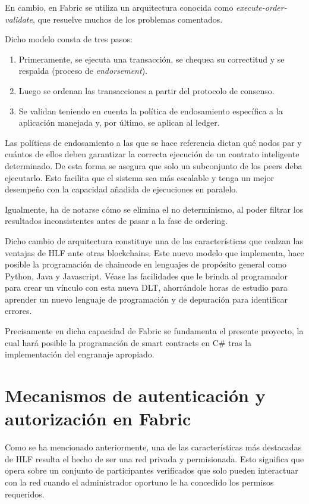 En cambio, en Fabric se utiliza un arquitectura conocida como \emph{execute-order-validate}, que resuelve muchos de los problemas comentados.

Dicho modelo consta de tres pasos:
\begin{enumerate}
	\item Primeramente, se ejecuta una transacci\'on, se chequea su correctitud y se respalda (proceso de \emph{endorsement}).
	
	\item Luego se ordenan las transacciones a partir del protocolo de consenso.
	
	\item Se validan teniendo en cuenta la pol\'itica de endosamiento espec\'ifica a la aplicaci\'on manejada y, por \'ultimo, se aplican al ledger.
\end{enumerate}

Las pol\'iticas de endosamiento a las que se hace referencia dictan qu\'e nodos par y cu\'antos de ellos deben garantizar la correcta ejecuci\'on de un contrato inteligente determinado. De esta forma se asegura que solo un subconjunto de los peers deba ejecutarlo. Esto facilita que el sistema sea m\'as escalable y tenga un mejor desempe\~no con la capacidad a\~nadida de ejecuciones en paralelo.

Igualmente, ha de notarse c\'omo se elimina el no determinismo, al poder filtrar los resultados inconsistentes antes de pasar a la fase de ordering.

Dicho cambio de arquitectura constituye una de las caracter\'isticas que realzan las ventajas de HLF ante otras blockchains. Este nuevo modelo que implementa, hace posible la programaci\'on de chaincode en lenguajes de propósito general como Python, Java y Javascript. V\'ease las facilidades que le brinda al programador para crear un v\'inculo con esta nueva DLT, ahorr\'andole horas de estudio para aprender un nuevo lenguaje de programaci\'on y de depuraci\'on para identificar errores. %


Precisamente en dicha capacidad de Fabric se fundamenta el presente proyecto, la cual har\'a posible la programaci\'on de smart contracts en C\# tras la implementaci\'on del engranaje apropiado.
 
\section{Mecanismos de autenticaci\'on y\\ autorizaci\'on en Fabric}
Como se ha mencionado anteriormente, una de las caracter\'isticas m\'as destacadas de HLF resulta el hecho de ser una red privada y permisionada. Esto significa que opera sobre un conjunto de participantes verificados que solo pueden interactuar con la red cuando el administrador oportuno le ha concedido los permisos requeridos. 

